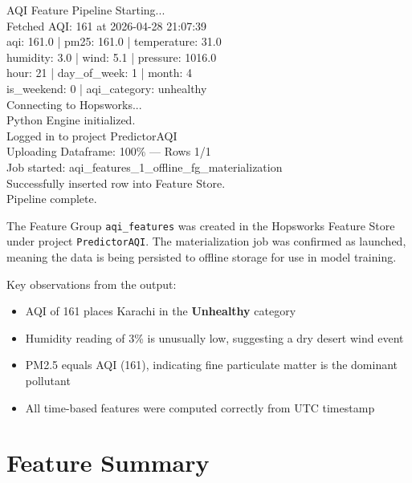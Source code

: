 \documentclass[conference]{IEEEtran}
\begin{document}
\begin{mdframed}[backgroundcolor=gray!10, linecolor=black, linewidth=1pt, leftline=true, rightline=false, topline=false, bottomline=false]
\ttfamily\footnotesize
AQI Feature Pipeline Starting...\\
Fetched AQI: 161 at 2026-04-28 21:07:39\\
aqi: 161.0 | pm25: 161.0 | temperature: 31.0\\
humidity: 3.0 | wind: 5.1 | pressure: 1016.0\\
hour: 21 | day\_of\_week: 1 | month: 4\\
is\_weekend: 0 | aqi\_category: unhealthy\\
Connecting to Hopsworks...\\
Python Engine initialized.\\
Logged in to project PredictorAQI\\
Uploading Dataframe: 100\% --- Rows 1/1\\
Job started: aqi\_features\_1\_offline\_fg\_materialization\\
Successfully inserted row into Feature Store.\\
Pipeline complete.
\end{mdframed}

\vspace{6pt}
The Feature Group \texttt{aqi\_features} was created in the Hopsworks Feature Store under project \texttt{PredictorAQI}. The materialization job was confirmed as launched, meaning the data is being persisted to offline storage for use in model training.

Key observations from the output:
\begin{itemize}[leftmargin=1.5em, itemsep=2pt]
    \item AQI of 161 places Karachi in the \textbf{Unhealthy} category
    \item Humidity reading of 3\% is unusually low, suggesting a dry desert wind event
    \item PM2.5 equals AQI (161), indicating fine particulate matter is the dominant pollutant
    \item All time-based features were computed correctly from UTC timestamp
\end{itemize}

\section{Feature Summary}
\end{document}
